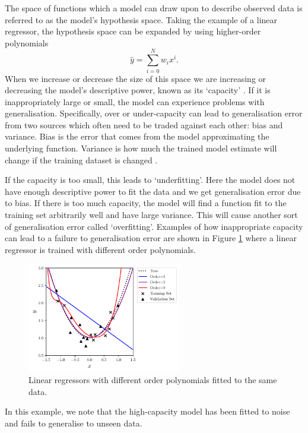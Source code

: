 The space of functions which a model can draw upon to describe observed data is referred to as the model's hypothesis space.
Taking the example of a linear regressor, the hypothesis space can be expanded by using higher-order polynomials
\begin{equation}
    \hat{y} = \sum_{i=0}^{N}w_{i}x^{i}.
\end{equation}
When we increase or decrease the size of this space we are increasing or decreasing the model's descriptive power, known as its `capacity' \cite{DeepLearningBook}. If it is inappropriately large or small, the model can experience problems with generalisation.
Specifically, over or under-capacity can lead to generalisation error from two sources which often need to be traded against each other: bias and variance. Bias is the error that comes from the model approximating the underlying function. Variance is how much the trained model estimate will change if the training dataset is changed \cite{DeepLearningBook}. 

If the capacity is too small, this leads to `underfitting'. Here the model does not have enough descriptive power to fit the data and we get generalisation error due to bias. If there is too much capacity, the model will find a function fit to the training set arbitrarily well and have large variance. This will cause another sort of generalisation error called `overfitting'. Examples of how inappropriate capacity can lead to a failure to generalisation error are shown in Figure \ref{fig:machine_learning:overfitting} where a linear regressor is trained with different order polynomials. 
\begin{figure}[h!]
        \includegraphics[width=0.6\textwidth]{figures/machine_learning/capacity.pdf}
    \caption{Linear regressors with different order polynomials fitted to the same data. }
        \label{fig:machine_learning:overfitting}
\end{figure}
In this example, we note that the high-capacity model has been fitted to noise and fails to generalise to unseen data. 

